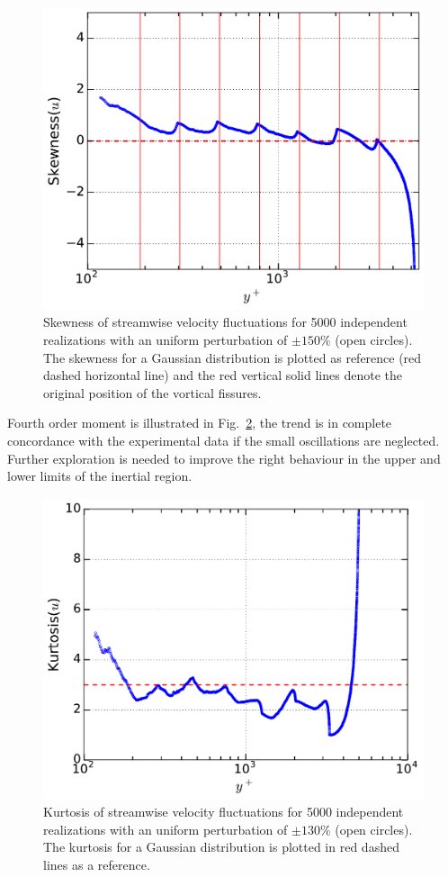 \documentclass[aps,reprint,amsmath,amssymb,pra]{revtex4-1}%
\begin{document}
\begin{figure}[tb]
\includegraphics[scale=0.46]{figures/skewness_5000_assembles_un150}
\caption{\label{fig:skewun130} Skewness of streamwise velocity fluctuations for 5000 independent realizations with an uniform perturbation of $\pm 150\%$ (open circles). The skewness for a Gaussian distribution is plotted as reference (red dashed horizontal line) and the red vertical solid lines denote the original position of the vortical fissures.}
\end{figure}
Fourth order moment is illustrated in Fig.~\ref{fig:kurtun130}, the trend is in complete concordance with the experimental data if the small oscillations are neglected. Further exploration is needed to improve the right behaviour in the upper and lower limits of the inertial region.
\begin{figure}[tbh] 
\includegraphics[scale=0.46]{figures/kurtosis_5000_assembles_un150}
\caption{\label{fig:kurtun130} Kurtosis of streamwise velocity fluctuations for 5000 independent realizations with an uniform perturbation of $\pm 130\%$ (open circles). The kurtosis for a Gaussian distribution is plotted in red dashed lines as a reference.} 
\end{figure}
\end{document}

